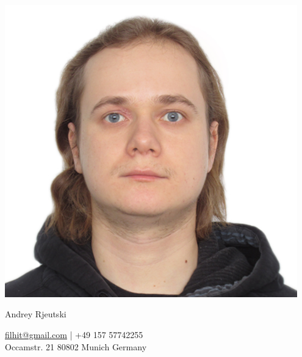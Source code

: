\documentclass[a4paper,11pt]{article}
\begin{document}
  \begin{minipage}{0.3\textwidth}
    \includegraphics[width=0.95\textwidth]{photo}
  \end{minipage}
  \begin{minipage}{0.69\textwidth}
    \begin{centering}
      {\Huge Andrey Rjeutski}

      \href{mailto:filhit@gmail.com}{filhit@gmail.com} | +49 157 57742255\\
      Occamstr. 21 80802 Munich Germany
	  
	\end{centering}
  \end{minipage}
  
\end{document}
